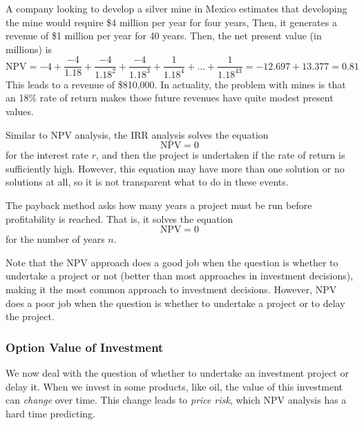 \documentclass{article}
\begin{document}
      \begin{example}
        A company looking to develop a silver mine in Mexico estimates that developing the mine would require \$4 million per year for four years, Then, it generates a revenue of \$1 million per year for 40 years. Then, the net present value (in millions) is 
        \[\text{NPV} = -4 + \frac{-4}{1.18} + \frac{-4}{1.18^2} + \frac{-4}{1.18^3} + \frac{1}{1.18^4} + \ldots + \frac{1}{1.18^{43}} = -12.697 + 13.377 = 0.81\]
        This leads to a revenue of \$810,000. In actuality, the problem with mines is that an 18\% rate of return makes those future revenues have quite modest present values. 
      \end{example}

      \begin{definition}
        Similar to NPV analysis, the IRR analysis solves the equation
        \[\text{NPV} = 0\]
        for the interest rate $r$, and then the project is undertaken if the rate of return is sufficiently high. However, this equation may have more than one solution or no solutions at all, so it is not transparent what to do in these events. 
      \end{definition}

      \begin{definition}
        The payback method asks how many years a project must be run before profitability is reached. That is, it solves the equation
        \[\text{NPV} = 0\]
        for the number of years $n$. 
      \end{definition}

      Note that the NPV approach does a good job when the question is whether to undertake a project or not (better than most approaches in investment decisions), making it the most common approach to investment decisions. However, NPV does a poor job when the question is whether to undertake a project or to delay the project. 

    \subsubsection{Option Value of Investment}

      We now deal with the question of whether to undertake an investment project or delay it. When we invest in some products, like oil, the value of this investment can \textit{change} over time. This change leads to \textit{price risk}, which NPV analysis has a hard time predicting. 
\end{document}
